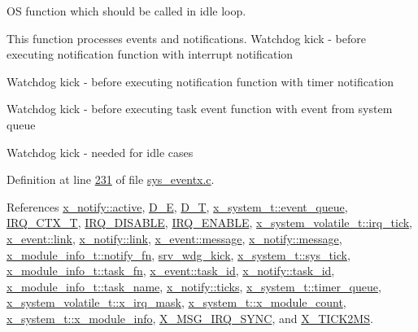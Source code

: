 O\+S function which should be called in idle loop. 

This function processes events and notifications. Watchdog kick -\/ before executing notification function with interrupt notification

Watchdog kick -\/ before executing notification function with timer notification

Watchdog kick -\/ before executing task event function with event from system queue

Watchdog kick -\/ needed for idle cases

Definition at line \hyperlink{a00037_source_l00231}{231} of file \hyperlink{a00037_source}{sys\+\_\+eventx.\+c}.



References \hyperlink{a00036_source_l00077}{x\+\_\+notify\+::active}, \hyperlink{a00040_source_l00066}{D\+\_\+\+E}, \hyperlink{a00040_source_l00059}{D\+\_\+\+T}, \hyperlink{a00037_source_l00079}{x\+\_\+system\+\_\+t\+::event\+\_\+queue}, \hyperlink{a00033_source_l00017}{I\+R\+Q\+\_\+\+C\+T\+X\+\_\+\+T}, \hyperlink{a00033_source_l00020}{I\+R\+Q\+\_\+\+D\+I\+S\+A\+B\+L\+E}, \hyperlink{a00033_source_l00025}{I\+R\+Q\+\_\+\+E\+N\+A\+B\+L\+E}, \hyperlink{a00037_source_l00098}{x\+\_\+system\+\_\+volatile\+\_\+t\+::irq\+\_\+tick}, \hyperlink{a00036_source_l00062}{x\+\_\+event\+::link}, \hyperlink{a00036_source_l00072}{x\+\_\+notify\+::link}, \hyperlink{a00036_source_l00064}{x\+\_\+event\+::message}, \hyperlink{a00036_source_l00075}{x\+\_\+notify\+::message}, \hyperlink{a00037_source_l00063}{x\+\_\+module\+\_\+info\+\_\+t\+::notify\+\_\+fn}, \hyperlink{a00067_source_l00028}{srv\+\_\+wdg\+\_\+kick}, \hyperlink{a00037_source_l00085}{x\+\_\+system\+\_\+t\+::sys\+\_\+tick}, \hyperlink{a00037_source_l00061}{x\+\_\+module\+\_\+info\+\_\+t\+::task\+\_\+fn}, \hyperlink{a00036_source_l00065}{x\+\_\+event\+::task\+\_\+id}, \hyperlink{a00036_source_l00076}{x\+\_\+notify\+::task\+\_\+id}, \hyperlink{a00037_source_l00065}{x\+\_\+module\+\_\+info\+\_\+t\+::task\+\_\+name}, \hyperlink{a00036_source_l00073}{x\+\_\+notify\+::ticks}, \hyperlink{a00037_source_l00081}{x\+\_\+system\+\_\+t\+::timer\+\_\+queue}, \hyperlink{a00037_source_l00096}{x\+\_\+system\+\_\+volatile\+\_\+t\+::x\+\_\+irq\+\_\+mask}, \hyperlink{a00037_source_l00076}{x\+\_\+system\+\_\+t\+::x\+\_\+module\+\_\+count}, \hyperlink{a00037_source_l00074}{x\+\_\+system\+\_\+t\+::x\+\_\+module\+\_\+info}, \hyperlink{a00036_source_l00020}{X\+\_\+\+M\+S\+G\+\_\+\+I\+R\+Q\+\_\+\+S\+Y\+N\+C}, and \hyperlink{a00036_source_l00051}{X\+\_\+\+T\+I\+C\+K2\+M\+S}.



